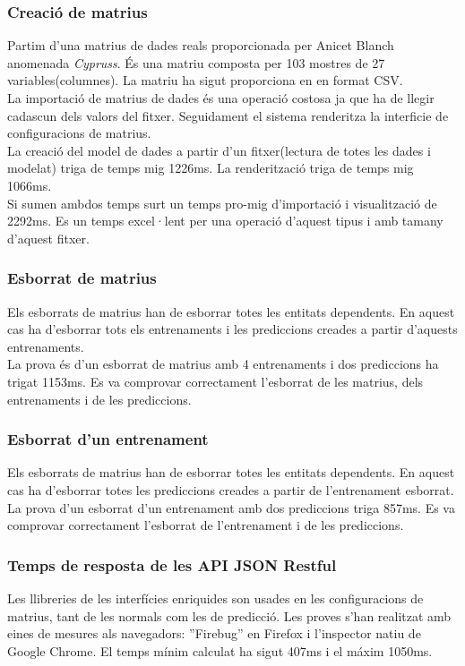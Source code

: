 \subsubsection{Creaci\'{o} de matrius}
\label{cypruss}
Partim d'una matrius de dades reals proporcionada per Anicet Blanch anomenada \textit{Cypruss}. \'{E}s una matriu composta per 103 mostres de 27 variables(columnes). La matriu ha sigut proporciona en en format CSV.\\

La importaci\'{o} de matrius de dades \'{e}s una operaci\'{o} costosa ja que ha de llegir cadascun dels valors del fitxer. Seguidament el sistema renderitza la interficie de configuracions de matrius.\\

La creaci\'{o} del model de dades a partir d'un fitxer(lectura de totes les dades i modelat) triga de temps mig 1226ms. La renderitzaci\'{o} triga de temps mig 1066ms.\\

Si sumen ambdos temps surt un temps pro-mig d'importació i visualització de 2292ms. Es un temps excel·lent per una operació d'aquest tipus i amb tamany d'aquest fitxer.

\subsubsection{Esborrat de matrius}
Els esborrats de matrius han de esborrar totes les entitats dependents. En aquest cas ha d'esborrar tots els entrenaments i les prediccions creades a partir d'aquests entrenaments.\\

La prova \'{e}s d'un esborrat de matrius amb 4 entrenaments i dos prediccions ha trigat 1153ms. Es va comprovar correctament l'esborrat de les matrius, dels entrenaments i de les prediccions.

\subsubsection{Esborrat d'un entrenament}
Els esborrats de matrius han de esborrar totes les entitats dependents. En aquest cas ha d'esborrar totes les prediccions creades a partir de l'entrenament esborrat.\\

La prova d'un esborrat d'un entrenament amb dos prediccions triga 857ms. Es va comprovar correctament l'esborrat de l'entrenament i de les prediccions.

\subsubsection{Temps de resposta de les API JSON Restful}
Les llibreries de les interfícies enriquides son usades en les configuracions de matrius, tant de les normals com les de predicci\'{o}. Les proves s'han realitzat amb eines de mesures als navegadors: ''Firebug'' en Firefox i l'inspector natiu de Google Chrome. El temps m\'{i}nim calculat ha sigut 407ms i el m\'{a}xim 1050ms.\\

